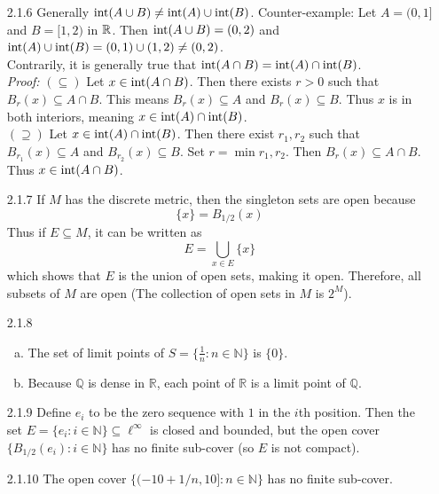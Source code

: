 \documentclass[../../Solutions.tex]{subfiles}
\begin{document}
\begin{itemize}
	\item [2.1.6] Generally $\text{int}(A\cup B) \neq \text{int}(A) \cup \text{int}(B)$.
		Counter-example: Let $A = (0,1]$ and $B = [1,2)$ in $\mathbb{R}$.
		Then $\text{int}(A\cup B) = (0,2)$ and $\text{int}(A)\cup\text{int}(B) = (0,1)\cup(1,2) \neq (0,2)$. \\
		Contrarily, it is generally true that $\text{int}(A\cap B) = \text{int}(A) \cap\text{int}(B)$. \\
		\textit{Proof:} $(\subseteq)$ Let $x \in \text{int}(A\cap B)$.
		Then there exists $r>0$ such that $B_r(x) \subseteq A\cap B$.
		This means $B_r(x) \subseteq A$ and $B_r(x) \subseteq B$.
		Thus $x$ is in both interiors, meaning $x \in \text{int}(A)\cap\text{int}(B)$. \\
		$(\supseteq)$ Let $x \in \text{int}(A)\cap\text{int}(B)$.
		Then there exist $r_1,r_2$ such that $B_{r_1}(x) \subseteq A$ and $B_{r_2}(x) \subseteq B$.
		Set $r = \min{r_1,r_2}$.
		Then $B_r(x) \subseteq A\cap B$.
		Thus $x \in \text{int}(A\cap B)$. \\
	
	\item [2.1.7] If $M$ has the discrete metric, then the singleton sets are open because
		$$ \{x\} = B_{1/2}(x) $$
		Thus if $E \subseteq M$, it can be written as
		$$ E = \bigcup_{x \in E} \{x\} $$
		which shows that $E$ is the union of open sets, making it open.
		Therefore, all subsets of $M$ are open
		(The collection of open sets in $M$ is $2^M$).
	
	\item [2.1.8]
	\begin{enumerate}[(a)]
		\item The set of limit points of $S=\{\frac{1}{n} : n \in \mathbb{N} \}$ is $\{0\}$.
		\item Because $\mathbb{Q}$ is dense in $\mathbb{R}$, each point of $\mathbb{R}$ is a limit point of $\mathbb{Q}$.
	\end{enumerate}
	
	\item [2.1.9] Define $e_i$ to be the zero sequence with $1$ in the $i$th position.
		Then the set $E = \{ e_i : i \in \mathbb{N}\} \subseteq \ell^\infty$ is closed and bounded, but the open cover $\{B_{1/2}(e_i) : i \in \mathbb{N}\}$ has no finite sub-cover (so $E$ is not compact).
	
	\item [2.1.10] The open cover $\{ (-10 + 1/n , 10] : n \in \mathbb{N} \}$ has no finite sub-cover.
	

\end{itemize}
\end{document}
